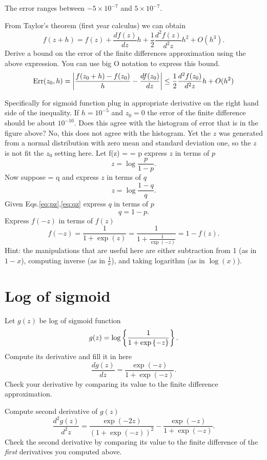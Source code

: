 \documentclass{article}
\begin{document}
\begin{remark} The error ranges between $-5\times10^{-7}$ and $5\times10^{-7}$.
\end{remark}

\newproblem{1pt}
From Taylor's theorem (first year calculus) we can obtain
\[
f(z+h) = f(z) + \frac{df(z)}{dz}h + \frac{1}{2}\frac{d^2f(z)}{d^2z}h^2 + O(h^3).
\]
Derive a bound on the error of the finite differences approximation using the above expression. You can use big O notation to express this bound.
\[
\textrm{Err}(z_0,h) = \left| \frac{f(z_0+h) - f(z_0)}{h} - \frac{df(z_0)}{dz} \right| \leq \frac{1}{2}\frac{d^2f(z_0)}{d^2z}h+O(h^2)
\]

Specifically for sigmoid function plug in appropriate derivative on the right hand side of the inequality. If $h=10^{-5}$ and $z_0 = 0$ the error of the finite difference should be about $10^{-10}$.
Does this agree with the histogram of error that is in the figure above?
No, this does not agree with the histogram. 
Yet the $z$ was generated from a normal distribution with zero mean and standard deviation one, so the $z$ is not fit the $z_0$ setting here.
\newproblem{1pt}
Let
\BEQ\label{eq:pz}
f(z) =  = p
\EEQ
express $z$ in terms of $p$
\[
z = \log\frac{p}{1-p}.
\]
Now suppose
\BEQ\label{eq:qz}
 = q
\EEQ
and express $z$ in terms of $q$
\[
z = \log\frac{1-q}{q}.
\]
Given Eqs.\eqref{eq:pz},\eqref{eq:qz} express $q$ in terms of $p$
\[
q = 1-p.
\]
Express $f(-z)$ in terms of $f(z)$
\[
f(-z) = \frac{1}{1+\exp(z)} = \frac{1}{1+\frac{1}{\exp(-z)}} = 1-f(z).
\]
Hint: the manipulations that are useful here are either subtraction from 1 (as in $1-x$), computing inverse (as in $\frac{1}{x}$), and taking logarithm (as in $\log(x)$).

\section*{Log of sigmoid}
\newproblem{1pt}
Let $g(z)$ be log of sigmoid function
\[
g(z) = \mathop{\rm log}\left\{ \frac{1}{1+ \mathop{\rm exp}\left\{-z\right\}} \right\}.
\]
Compute its derivative and fill it in here
\[
\frac{dg(z)}{dz} =  \frac{\exp(-z)}{1+\exp(-z)}.%
\]
Check your derivative by comparing its value to the finite difference approximation.


\newproblem{1pt}
Compute second derivative of $g(z)$
\[
\frac{d^2g(z)}{d^2z} =  \frac{\exp(-2z)}{(1 + \exp(-z))^2} - \frac{\exp(-z)}{1 + \exp(-z)}.%
\]
Check the second derivative by comparing its value to the finite difference of the {\em first} derivatives you computed above.
\end{document}
